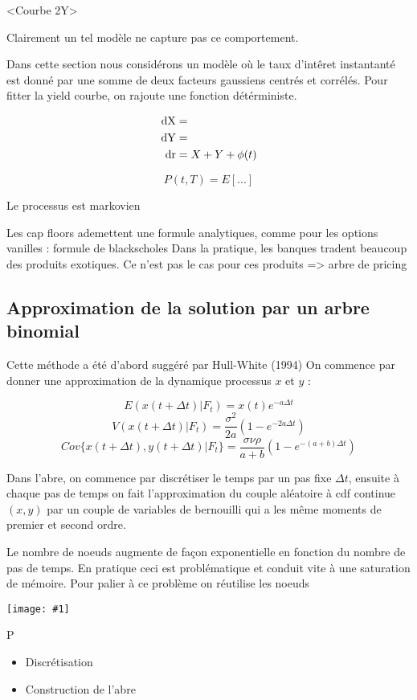 \documentclass[paper=a4, fontsize=11pt]{scrartcl}
\numberwithin{equation}{section}		%
\numberwithin{figure}{section}			%
\numberwithin{table}{section}				%
\newcommand{\IMG}[3]{
\texttt{[image: \#1]}%
}
\begin{document}
<Courbe 2Y>

Clairement un tel modèle ne capture pas ce comportement.

Dans cette section nous considérons un modèle où le taux d'intêret instantanté est donné par une somme de deux facteurs gaussiens centrés et corrélés. Pour fitter la yield courbe, on rajoute une fonction détérministe.

\begin{align*}
  \rm{d}X &= \\
  \rm{d}Y &= \\
  \rm{d} r &= X + Y + \phi(t)
\end{align*}

$$P(t, T) = E[...]$$

Le processus est markovien

Les cap floors ademettent une formule analytiques, comme pour les options vanilles : formule de blackscholes
Dans la pratique, les banques tradent beaucoup des produits exotiques. Ce n'est pas le cas pour ces produits => arbre de pricing

\subsection{Approximation de la solution par un arbre binomial}

Cette méthode a été d'abord suggéré par Hull-White (1994)
On commence par donner une approximation de la dynamique processus $x$ et $y$ :

$$E(x(t+\Delta t) | F_t) = x(t) e^{-a \Delta t}$$
$$V(x(t+\Delta t) | F_t) = \frac{\sigma^2}{2a} (1 - e^{-2a \Delta t})$$
$$Cov\{x(t+\Delta t), y(t+\Delta t) | F_t \} = \frac{\sigma \nu \rho}{a + b} (1-e^{-(a+b)\Delta t})$$

Dans l'abre, on commence par discrétiser le temps par un pas fixe $\Delta t$, ensuite à chaque pas de temps on fait l'approximation du couple aléatoire à cdf continue $(x, y)$ par un couple de variables de bernouilli qui a les même moments de premier et second ordre.

Le nombre de noeuds augmente de façon exponentielle en fonction du nombre de pas de temps. En pratique ceci est problématique et conduit vite à une saturation de mémoire. Pour palier à ce problème on  réutilise les noeuds


\IMG{img/slice.png}{Slice}{0.5}
P

\begin{itemize}
\item Discrétisation
\item Construction de l'abre
\end{itemize}
\end{document}

